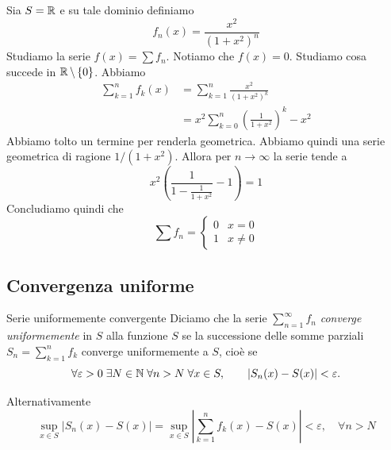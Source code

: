 \documentclass[a4paper]{article}
\begin{document}
\begin{radioactive}
\begin{snippetexample}{}
    Sia \(S = \mathbb{R}\)
    e su tale dominio definiamo
    \[
        f_n(x) = \frac{x^2}{{(1 + x^2)}^n}
    \]
    Studiamo la serie \(f(x) = \sum f_n\).
    Notiamo che \(f(x) = 0\). Studiamo cosa succede in \(\mathbb{R} \,\backslash\, \{0\}\).
    Abbiamo
    \begin{align*}
        \sum_{k=1}^n f_k(x) &= \sum_{k=1}^n \frac{x^2}{(1+x^2)^k} \\
        &= x^2 \sum_{k=0}^n \left(
            \frac{1}{1 + x^2}
        \right)^k - x^2
    \end{align*}
    Abbiamo tolto un termine per renderla geometrica.
    Abbiamo quindi una serie geometrica di ragione \(1 / (1 + x^2)\).
    Allora per \(n \to \infty\) la serie tende a
    \[
        x^2 \left(
            \frac{1}{1- \frac{1}{1 + x^2}} - 1
        \right) = 1
    \]
    Concludiamo quindi che
    \[
        \sum f_n =
        \begin{cases}
            0 & x = 0 \\
            1 & x \neq 0
        \end{cases}
    \]
\end{snippetexample}
\end{radioactive}

\subsection{Convergenza uniforme}

\begin{radioactive}
\begin{snippetdefinition}{Serie uniformemente convergente}
    Diciamo che la serie \(\sum_{n=1}^\infty f_n\) \emph{converge uniformemente}
    in \(S\) alla funzione \(S\) se la successione delle somme parziali
    \(S_n=\sum_{k=1}^n f_k\) converge uniformemente a \(S\), cioè se
    \[
        \forall\varepsilon>0\;\exists N\in\mathbb{N}\;\forall n>N\;\forall x\in S,
        \qquad |S_n(x)-S(x)|<\varepsilon.
    \]
\end{snippetdefinition}
\end{radioactive}

\begin{radioactive}
Alternativamente
\[
    \sup_{x \in S} |S_n(x) - S(x)| = \sup_{x\in S} \left|
    \sum_{k=1}^n f_k(x) - S(x)
    \right| < \varepsilon, \quad \forall n > N
\]
\end{radioactive}
\end{document}

